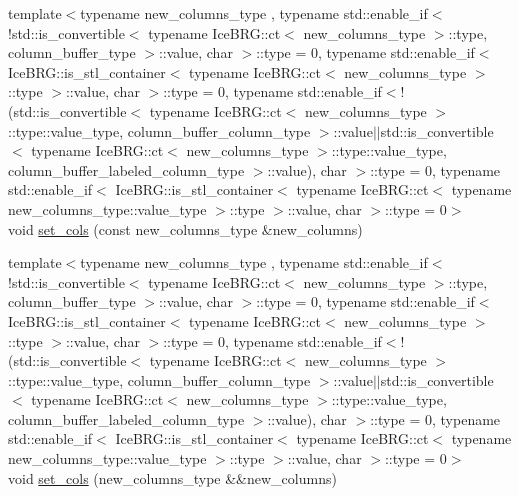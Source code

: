 \begin{DoxyCompactItemize}
\item 
{\footnotesize template$<$typename new\+\_\+columns\+\_\+type , typename std\+::enable\+\_\+if$<$!std\+::is\+\_\+convertible$<$ typename Ice\+B\+R\+G\+::ct$<$ new\+\_\+columns\+\_\+type $>$\+::type, column\+\_\+buffer\+\_\+type $>$\+::value, char $>$\+::type  = 0, typename std\+::enable\+\_\+if$<$ Ice\+B\+R\+G\+::is\+\_\+stl\+\_\+container$<$ typename Ice\+B\+R\+G\+::ct$<$ new\+\_\+columns\+\_\+type $>$\+::type $>$\+::value, char $>$\+::type  = 0, typename std\+::enable\+\_\+if$<$!(std\+::is\+\_\+convertible$<$ typename Ice\+B\+R\+G\+::ct$<$ new\+\_\+columns\+\_\+type $>$\+::type\+::value\+\_\+type, column\+\_\+buffer\+\_\+column\+\_\+type $>$\+::value$\vert$$\vert$std\+::is\+\_\+convertible$<$ typename Ice\+B\+R\+G\+::ct$<$ new\+\_\+columns\+\_\+type $>$\+::type\+::value\+\_\+type, column\+\_\+buffer\+\_\+labeled\+\_\+column\+\_\+type $>$\+::value), char $>$\+::type  = 0, typename std\+::enable\+\_\+if$<$ Ice\+B\+R\+G\+::is\+\_\+stl\+\_\+container$<$ typename Ice\+B\+R\+G\+::ct$<$ typename new\+\_\+columns\+\_\+type\+::value\+\_\+type $>$\+::type $>$\+::value, char $>$\+::type  = 0$>$ }\\void \hyperlink{classIceBRG_1_1labeled__array_a7f509f2380a194ceb80fed39a10eff06}{set\+\_\+cols} (const new\+\_\+columns\+\_\+type \&new\+\_\+columns)
\item 
{\footnotesize template$<$typename new\+\_\+columns\+\_\+type , typename std\+::enable\+\_\+if$<$!std\+::is\+\_\+convertible$<$ typename Ice\+B\+R\+G\+::ct$<$ new\+\_\+columns\+\_\+type $>$\+::type, column\+\_\+buffer\+\_\+type $>$\+::value, char $>$\+::type  = 0, typename std\+::enable\+\_\+if$<$ Ice\+B\+R\+G\+::is\+\_\+stl\+\_\+container$<$ typename Ice\+B\+R\+G\+::ct$<$ new\+\_\+columns\+\_\+type $>$\+::type $>$\+::value, char $>$\+::type  = 0, typename std\+::enable\+\_\+if$<$!(std\+::is\+\_\+convertible$<$ typename Ice\+B\+R\+G\+::ct$<$ new\+\_\+columns\+\_\+type $>$\+::type\+::value\+\_\+type, column\+\_\+buffer\+\_\+column\+\_\+type $>$\+::value$\vert$$\vert$std\+::is\+\_\+convertible$<$ typename Ice\+B\+R\+G\+::ct$<$ new\+\_\+columns\+\_\+type $>$\+::type\+::value\+\_\+type, column\+\_\+buffer\+\_\+labeled\+\_\+column\+\_\+type $>$\+::value), char $>$\+::type  = 0, typename std\+::enable\+\_\+if$<$ Ice\+B\+R\+G\+::is\+\_\+stl\+\_\+container$<$ typename Ice\+B\+R\+G\+::ct$<$ typename new\+\_\+columns\+\_\+type\+::value\+\_\+type $>$\+::type $>$\+::value, char $>$\+::type  = 0$>$ }\\void \hyperlink{classIceBRG_1_1labeled__array_abfc8ab1fb751a4d640985b4c2b1ec73c}{set\+\_\+cols} (new\+\_\+columns\+\_\+type \&\&new\+\_\+columns)

\end{DoxyCompactItemize}
